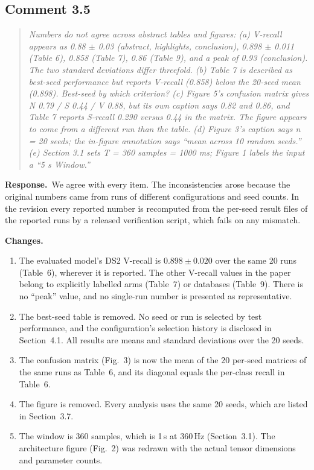 \documentclass[11pt]{article}
\newenvironment{reviewer}{\begin{quote}\itshape\color{revcol}}{\end{quote}}
\newcommand{\resp}{\textbf{Response.}~}
\newcommand{\chg}{\textbf{Changes.}~}
\begin{document}
\subsection*{Comment 3.5}
\begin{reviewer}
Numbers do not agree across abstract tables and figures: (a) V-recall appears as 0.88 $\pm$ 0.03 (abstract, highlights, conclusion), 0.898 $\pm$ 0.011 (Table 6), 0.858 (Table 7), 0.86 (Table 9), and a peak of 0.93 (conclusion). The two standard deviations differ threefold. (b) Table 7 is described as best-seed performance but reports V-recall (0.858) below the 20-seed mean (0.898). Best-seed by which criterion? (c) Figure 5's confusion matrix gives N 0.79 / S 0.44 / V 0.88, but its own caption says 0.82 and 0.86, and Table 7 reports S-recall 0.290 versus 0.44 in the matrix. The figure appears to come from a different run than the table. (d) Figure 3's caption says n = 20 seeds; the in-figure annotation says ``mean across 10 random seeds.'' (e) Section 3.1 sets T = 360 samples = 1000 ms; Figure 1 labels the input a ``5 s Window.''
\end{reviewer}
\resp We agree with every item. The inconsistencies arose because the original numbers came from runs of different configurations and seed counts. In the revision every reported number is recomputed from the per-seed result files of the reported runs by a released verification script, which fails on any mismatch.

\chg
\begin{enumerate}[label=(\alph*),leftmargin=1.6em,itemsep=2pt]
\item The evaluated model's DS2 V-recall is $0.898\pm0.020$ over the same 20 runs (Table~6), wherever it is reported. The other V-recall values in the paper belong to explicitly labelled arms (Table~7) or databases (Table~9). There is no ``peak'' value, and no single-run number is presented as representative.
\item The best-seed table is removed. No seed or run is selected by test performance, and the configuration's selection history is disclosed in Section~4.1. All results are means and standard deviations over the 20 seeds.
\item The confusion matrix (Fig.~3) is now the mean of the 20 per-seed matrices of the same runs as Table~6, and its diagonal equals the per-class recall in Table~6.
\item The figure is removed. Every analysis uses the same 20 seeds, which are listed in Section~3.7.
\item The window is 360 samples, which is 1\,s at 360\,Hz (Section~3.1). The architecture figure (Fig.~2) was redrawn with the actual tensor dimensions and parameter counts.
\end{enumerate}
\end{document}
